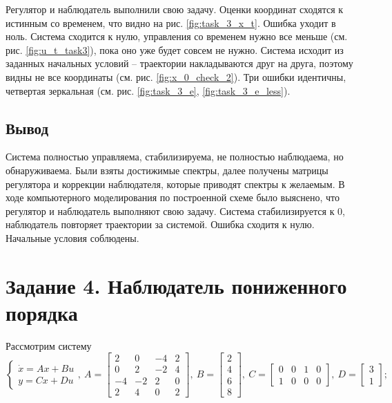 \documentclass[a4paper, 12pt]{article}
\begin{document}
    \noindent Регулятор и наблюдатель выполнили свою задачу.
    Оценки координат сходятся к истинным со временем, что видно на рис. \ref{fig:task_3_x_t}. Ошибка
    уходит в ноль. Система сходится к нулю, управления со временем нужно все меньше (см. рис. \ref{fig:u_t_task3}), пока
    оно уже будет совсем не нужно. Система исходит из заданных начальных условий -- траектории накладываются друг на друга,
    поэтому видны не все координаты (см. рис. \ref{fig:x_0_check_2}). Три ошибки идентичны, четвертая зеркальная (см. рис. \ref{fig:task_3_e}, \ref{fig:task_3_e_less}).


    \subsection{Вывод}
    Система полностью управляема, стабилизируема, не полностью наблюдаема, но обнаруживаема.
    Были взяты достижимые спектры, далее получены матрицы регулятора и коррекции наблюдателя,
    которые приводят спектры к желаемым. В ходе компьютерного моделирования по построенной схеме
    было выяснено, что регулятор и наблюдатель выполняют свою задачу. Система стабилизируется к 0,
    наблюдатель повторяет траектории за системой. Ошибка сходитя к нулю. Начальные условия соблюдены.


    \section{Задание 4. Наблюдатель пониженного порядка}
    Рассмотрим систему
    $$
    \begin{cases}
        \dot{x}=Ax+Bu\\
        y=Cx+Du
    \end{cases},\ A=\begin{bmatrix}
        2 &0 &-4 &2\\
        0 &2 &-2 &4\\
        -4 &-2 &2 &0\\
        2 &4 &0 &2
    \end{bmatrix},\ B=\begin{bmatrix}
        2\\
        4\\
        6\\
        8
    \end{bmatrix},\ C=\begin{bmatrix}
        0 &0 &1 &0\\
        1 &0 &0 &0
    \end{bmatrix},\ D=\begin{bmatrix}
        3\\1
    \end{bmatrix};
    $$
\end{document}
